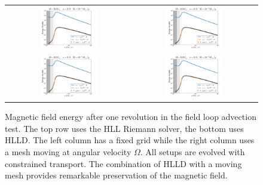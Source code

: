 \begin{figure}
\begin{center}
\begin{tabular}{cc}
	\includegraphics[width=0.48\textwidth]{figures/numerics/nt_eps.pdf} & \includegraphics[width=0.48\textwidth]{figures/numerics/nt_eps.pdf} \\
	\includegraphics[width=0.48\textwidth]{figures/numerics/nt_eps.pdf} & \includegraphics[width=0.48\textwidth]{figures/numerics/nt_eps.pdf} 
\end{tabular}
\end{center}
\caption{Magnetic field energy after one revolution in the field loop advection test.  The top row uses the HLL Riemann solver, the bottom uses HLLD.  The left column has a fixed grid while the right column uses a mesh moving at angular velocity $\Omega$.  All setups are evolved with constrained transport. The combination of HLLD with a moving mesh provides remarkable preservation of the magnetic field.  }
\end{figure}

